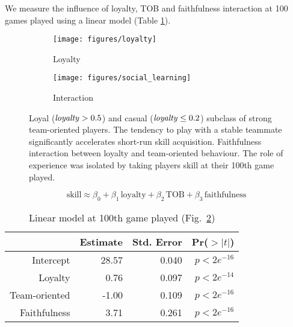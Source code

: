 \documentclass[a0,portrait]{a0poster}
\begin{document}
\begin{multicols}{2}
\vspace{0.6cm}


We measure the influence of loyalty, TOB and faithfulness interaction at 100 games played using a linear model (Table \ref{model}).

\begin{figure}[H]
  \vspace{1cm}
    \centering
    \begin{subfigure}[t]{0.23\textwidth}
      \texttt{[image: figures/loyalty]}
    \caption{Loyalty}
    \label{learningskill_pteam89_ployal}
    \end{subfigure}
    \begin{subfigure}[t]{0.23\textwidth}
    \texttt{[image: figures/social\_learning]}
    \caption{Interaction}
    \label{skillModels_loyaltyTeamOriented_imageEmpirical}
  \end{subfigure}
    \caption{ Loyal ($\text{\emph{loyalty}}>0.5$) and casual ($\text{\emph{loyalty}}\leq 0.2$) subclass of strong team-oriented players. The tendency to play with a stable teammate significantly accelerates short-run skill acquisition. 
     Faithfulness interaction between loyalty and team-oriented behaviour. The role of experience was isolated by taking players skill at their 100th game played.
    }
    \label{faithfulness}
\end{figure}
\begin{equation}
\text{skill} \approx \beta_0 + \beta_1 \, \text{loyalty} + \beta_2 \, \text{TOB} + \beta_3 \, \text{faithfulness} 
\end{equation}


\setlength{\columnsep}{10pt}
\begin{multicols}{2}

\begin{table}[H]
\vspace{-0.8cm}
\centering
\begin{tabular}{rrrr}

 & Estimate & Std. Error & Pr($>|t|$) \\ 
  \hline 
  Intercept & 28.57 & 0.040 & $p< 2e^{-16}$ \\ 
  Loyalty & 0.76 & 0.097  & $p< 2e^{-14}$ \\ 
  Team-oriented & -1.00 & 0.109 & $p< 2e^{-16}$ \\ 
  Faithfulness & 3.71 & 0.261 & $p< 2e^{-16}$ \\ 
   \hline
\end{tabular}
\caption{Linear model at 100th game played (Fig.~\ref{skillModels_loyaltyTeamOriented_imageEmpirical})}
\label{model}
\end{table}


\end{multicols}
\end{multicols}
\end{document}
